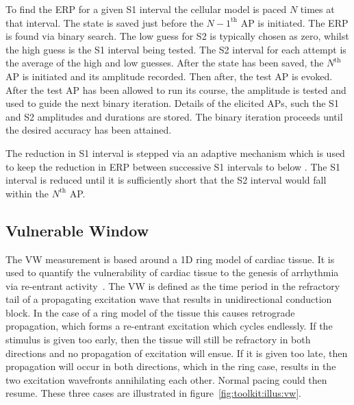 To find the ERP for a given S1 interval the cellular model is paced $N$ times
at that interval.
The state is saved just before the $N-1^{\text{th}}$ AP is initiated.
The ERP is found via binary search.
The low guess for S2 is typically chosen as zero, whilst the high guess is the
S1 interval being tested.
The S2 interval for each attempt is the average of the high and low guesses.
After the state has been saved, the $N^{\text{th}}$ AP is initiated and its
amplitude recorded.
Then  after, the test AP is evoked.
After the test AP has been allowed to run its course, the amplitude is tested
and used to guide the next binary iteration.
Details of the elicited APs, such the S1 and S2 amplitudes and durations are
stored.
The binary iteration proceeds until the desired accuracy has been attained.

The reduction in S1 interval is stepped via an adaptive mechanism which is
used to keep the reduction in ERP between successive S1 intervals to below
.  The S1 interval is reduced until it is sufficiently short that the
S2 interval would fall within the $N^{\text{th}}$ AP.

\subsection{Vulnerable Window}

The VW measurement is based around a 1D ring model of cardiac tissue.
It is used to quantify the vulnerability of cardiac tissue to the genesis of
arrhythmia via re-entrant activity~\cite{Quan1990,Zhang2003,Gonzalez2003}.
The VW is defined as the time period in the refractory tail of a propagating
excitation wave that results in unidirectional conduction block.
In the case of a ring model of the tissue this causes retrograde propagation,
which forms a re-entrant excitation which cycles endlessly.
If the stimulus is given too early, then the tissue will still be refractory in
both directions and no propagation of excitation will ensue.
If it is given too late, then propagation will occur in both directions, which
in the ring case, results in the two excitation wavefronts annihilating each
other.
Normal pacing could then resume.
These three cases are illustrated in figure~\ref{fig:toolkit:illus:vw}.


